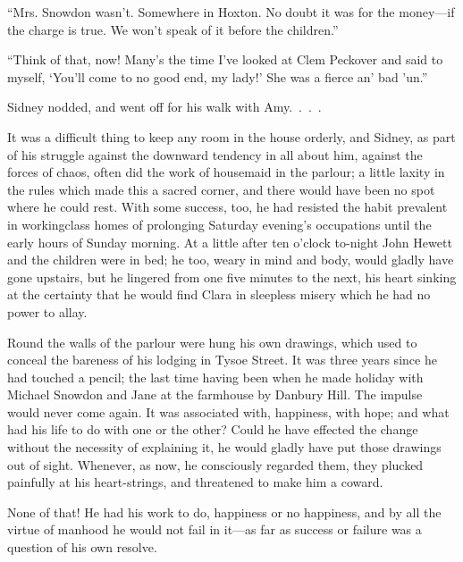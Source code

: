 ``Mrs. Snowdon wasn't. Somewhere in Hoxton. No doubt it was for the
money---if the charge is true. We won't speak of it before the
children.''

``Think of that, now! Many's the time I've looked at Clem Peckover and
said to myself, {}`You'll come to no good end, my lady!' She was a
fierce an' bad 'un.''

Sidney nodded, and went off for his walk with Amy{.~.~.~.}

It was a difficult thing to keep any room in the house orderly, and
Sidney, as part of his struggle against the downward tendency in all
about him, against the forces of chaos, often did the work of housemaid
in the parlour; a little laxity in the rules which made this a sacred
corner, and there would have been no spot where he could rest. With some
success, too, he had resisted the habit prevalent in workingclass homes
of prolonging Saturday evening's occupations until the early hours of
Sunday morning. At a little after ten o'clock to-night John Hewett and
the children were in bed; he too, weary in mind and body, would gladly
have gone upstairs, but he lingered from one five minutes to the next,
his heart sinking at the certainty that he would find Clara in sleepless
misery which he had no power to allay.

Round the walls of the parlour were hung his own drawings, which used to
conceal the bareness of his lodging in Tysoe Street. It was {}three
years since he had touched a pencil; the last time having been when he
made holiday with Michael Snowdon and Jane at the farmhouse by Danbury
Hill. The impulse would never come again. It was associated with,
happiness, with hope; and what had his life to do with one or the other?
Could he have effected the change without the necessity of explaining
it, he would gladly have put those drawings out of sight. Whenever, as
now, he consciously regarded them, they plucked painfully at his
heart-strings, and threatened to make him a coward.

None of that! He had his work to do, happiness or no happiness, and by
all the virtue of manhood he would not fail in it---as far as success or
failure was a question of his own resolve.

